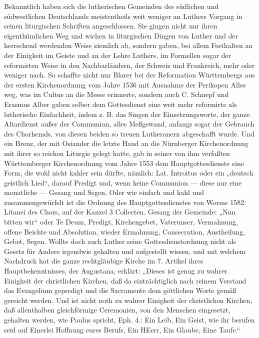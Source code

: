 Bekanntlich haben sich die lutherischen Gemeinden des südlichen und südwestlichen Deutschlands meistentheils weit weniger an Luthers Vorgang in seinen liturgischen Schriften angeschlossen. Sie gingen nicht nur ihren eigenthümlichen Weg und wichen in liturgischen Dingen von Luther und der herrschend werdenden Weise ziemlich ab, sondern gaben, bei allem Festhalten an der Einigkeit im Geiste und an der Lehre Luthers, im Formellen sogar der
reformirten Weise in den Nachbarländern, der Schweiz und Frankreich, mehr oder weniger nach. So schaffte nicht nur Blarer bei der Reformation Württembergs aus der ersten Kirchenordnung vom Jahre 1536 mit Ausnahme der Perikopen Alles weg, was im Cultus an die Messe erinnerte, sondern auch C. Schnepf und Erasmus Alber gaben selber dem Gottesdienst eine weit mehr reformirte als lutherische Einfachheit, indem z. B. das Singen der Einsetzungsworte, der ganze Altardienst außer der Communion, alles Meßgewand, anfangs sogar der Gebrauch des Chorhemds, von diesen beiden so treuen Lutheranern abgeschafft wurde. Und ein Brenz, der mit Osiander die letzte Hand an die Nürnberger Kirchenordnung mit ihrer so reichen Liturgie gelegt hatte, gab in seiner von ihm verfaßten Württemberger Kirchenordnung vom Jahre 1553 dem Hauptgottesdienste eine Form, die wohl nicht kahler sein dürfte, nämlich: Lat. Introitus oder ein „deutsch geistlich Lied“, darauf Predigt und, wenn keine Communion — diese nur eine monatliche — Gesang und Segen. Oder wie einfach und kahl und zusammengewürfelt ist die Ordnung des Hauptgottesdienstes von Worms 1582: Litanei des Chors, auf der Kanzel 3 Collecten. Gesang der Gemeinde: „Nun bitten wir“ oder Te Deum, Predigt, Kirchengebet, Vaterunser, Vermahnung, offene Beichte und Absolution, wieder Ermahnung, Consecration, Austheilung, Gebet, Segen. Wollte doch auch Luther seine Gottesdienstordnung nicht als Gesetz für Andere irgendwie gehalten und aufgestellt wissen, und mit welchem Nachdruck hat die ganze rechtgläubige Kirche im 7. Artikel ihres Hauptbekenntnisses, der Augustana, erklärt: „Dieses ist genug zu wahrer Einigkeit der christlichen Kirchen, daß da einträchtiglich nach reinem Verstand das Evangelium gepredigt und die Sacramente dem göttlichen Worte gemäß gereicht werden. Und ist nicht noth zu wahrer Einigkeit der christlichen Kirchen, daß allenthalben gleichförmige Ceremonien, von den Menschen eingesetzt, gehalten werden, wie Paulus spricht, Eph. 4.: Ein Leib, Ein Geist, wie ihr berufen seid auf Einerlei Hoffnung eures Berufs, Ein HEerr, Ein Glaube, Eine Taufe.“

